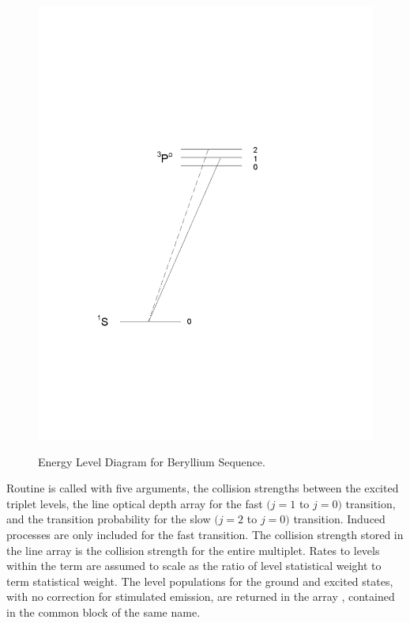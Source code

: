 \begin{figure}
\centering
\includegraphics[scale=0.5]{AtomBeSequence}
\label{fig:AtomBeSequence}
\caption{Energy Level Diagram for Beryllium Sequence.}
\end{figure}

Routine  is called with five arguments, the collision strengths
between the excited triplet levels, the line optical depth array for the
fast $(j=1$ to $j=0)$ transition, and the transition probability for the slow
$(j=2$ to $j=0)$ transition. Induced processes are only included for the fast
transition.   The collision strength stored in the line array is the
collision strength for the entire multiplet.  Rates to levels within the
term are assumed to scale as the ratio of level statistical weight to term
statistical weight.  The level populations for the ground and excited states,
with no correction for stimulated emission, are returned in the array
, contained in the common block of the same name.

